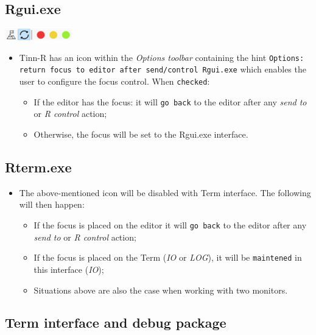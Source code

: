 \subsection{Rgui.exe}

\includegraphics[scale=1]{./res/focus.png}

\begin{itemize}
  \item Tinn-R has an icon within the \textit{Options toolbar}
    containing the hint \texttt{Options: return focus to editor
      after send/control Rgui.exe} which enables the user to configure
    the focus control. When \texttt{checked}:
    \begin{itemize}
      \item If the editor has the focus: it will \texttt{go back}
        to the editor after any \textit{send to} or \textit{R control}
        action;
      \item Otherwise, the focus will be set to the Rgui.exe interface.
    \end{itemize}
\end{itemize}


\subsection{Rterm.exe}

\begin{itemize}
  \item The above-mentioned icon will be disabled with Term interface.
    The following will then happen:
    \begin{itemize}
      \item If the focus is placed on the editor it will \texttt{go back}
        to the editor after any \textit{send to} or \textit{R control} action;
      \item If the focus is placed on the Term (\textit{IO} or \textit{LOG}),
        it will be \texttt{maintened} in this interface (\textit{IO});
      \item Situations above are also the case when working with two monitors.
    \end{itemize}
\end{itemize}


\newpage
\subsection{Term interface and debug package}

